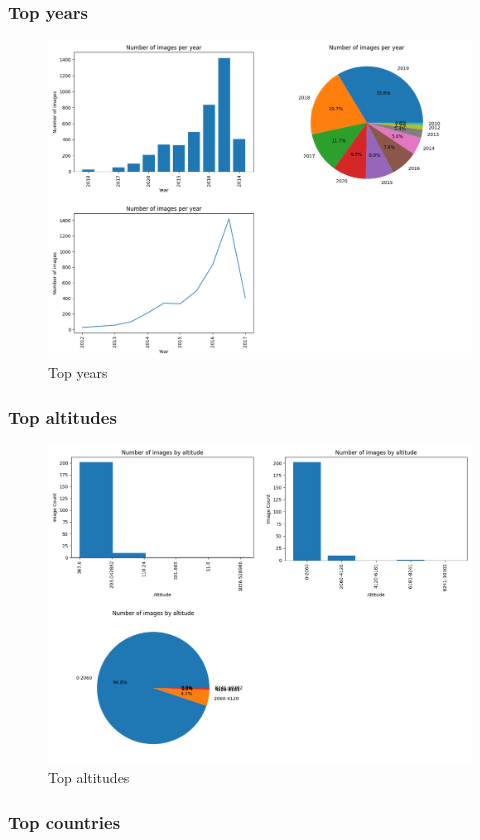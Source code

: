 \documentclass{article}
\begin{document}
    \newpage

    \subsubsection{Top years}\label{subsubsec:top_years}

    \begin{figure}[htbp]
        \centering
        \includegraphics[width=0.65 \textwidth]{img/year}
        \caption{Top years}
        \label{fig:top_years}
    \end{figure}

    \subsubsection{Top altitudes}\label{subsubsec:top_altitudes}

    \begin{figure}[htbp]
        \centering
        \includegraphics[width=0.65 \textwidth]{img/altitude}
        \caption{Top altitudes}
        \label{fig:top_altitudes}
    \end{figure}

    \newpage

    \subsubsection{Top countries}\label{subsubsec:top_countries}
\end{document}
